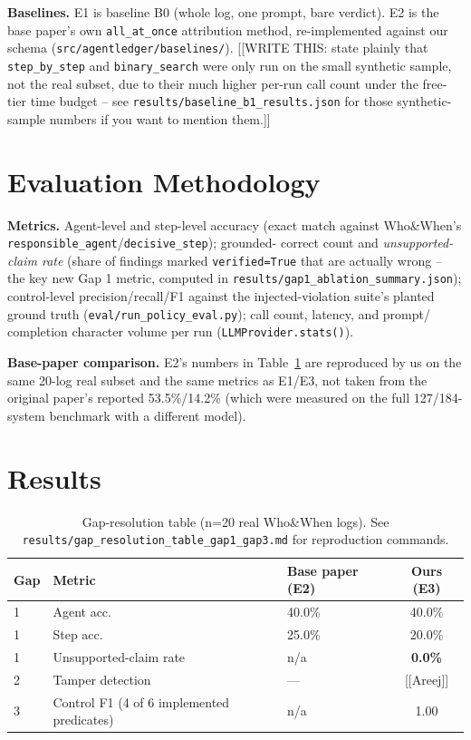 \documentclass[conference]{IEEEtran}
\begin{document}
\textbf{Baselines.} E1 is baseline B0 (whole log, one prompt, bare verdict).
E2 is the base paper's own \texttt{all\_at\_once} attribution method,
re-implemented against our schema (\texttt{src/agentledger/baselines/}).
[[WRITE THIS: state plainly that \texttt{step\_by\_step} and
\texttt{binary\_search} were only run on the small synthetic sample, not
the real subset, due to their much higher per-run call count under the
free-tier time budget -- see \texttt{results/baseline\_b1\_results.json}
for those synthetic-sample numbers if you want to mention them.]]

\section{Evaluation Methodology}
\textbf{Metrics.} Agent-level and step-level accuracy (exact match against
Who\&When's \texttt{responsible\_agent}/\texttt{decisive\_step}); grounded-
correct count and \emph{unsupported-claim rate} (share of findings marked
\texttt{verified=True} that are actually wrong -- the key new Gap 1 metric,
computed in \texttt{results/gap1\_ablation\_summary.json}); control-level
precision/recall/F1 against the injected-violation suite's planted ground
truth (\texttt{eval/run\_policy\_eval.py}); call count, latency, and prompt/
completion character volume per run (\texttt{LLMProvider.stats()}).

\textbf{Base-paper comparison.} E2's numbers in Table~\ref{tab:gap1gap3} are
reproduced by us on the same 20-log real subset and the same metrics as
E1/E3, not taken from the original paper's reported 53.5\%/14.2\% (which
were measured on the full 127/184-system benchmark with a different model).

\section{Results}
\label{sec:results}

\begin{table}[t]
\centering
\caption{Gap-resolution table (n=20 real Who\&When logs). See
\texttt{results/gap\_resolution\_table\_gap1\_gap3.md} for reproduction
commands.}
\label{tab:gap1gap3}
\small
\begin{tabular}{@{}lllc@{}}
\toprule
Gap & Metric & Base paper (E2) & Ours (E3) \\
\midrule
1 & Agent acc. & 40.0\% & 40.0\% \\
1 & Step acc. & 25.0\% & 20.0\% \\
1 & Unsupported-claim rate & n/a & \textbf{0.0\%} \\
2 & Tamper detection & --- & [[Areej]] \\
3 & Control F1 (4 of 6 implemented predicates) & n/a & 1.00 \\
\bottomrule
\end{tabular}
\end{table}
\end{document}
